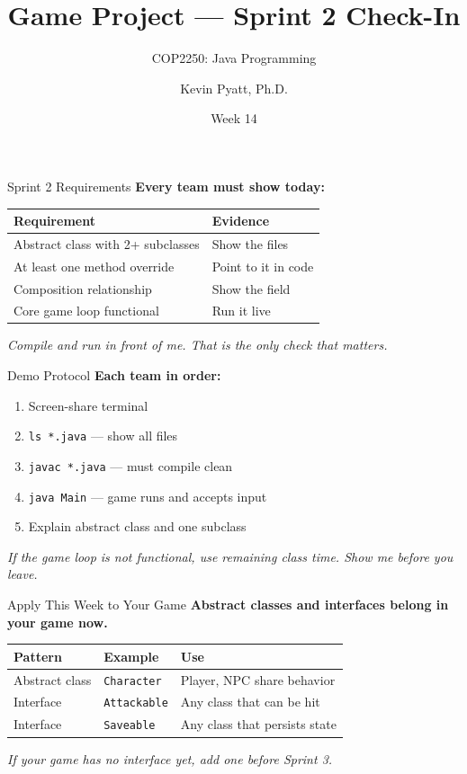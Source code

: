 \documentclass{beamer}
\title[Sprint 2 Check-In]{Game Project --- Sprint 2 Check-In}
\subtitle{COP2250: Java Programming}
\author{Kevin Pyatt, Ph.D.}
\institute{State College of Florida \\ Pyatt Labs}
\date{Week 14}
\begin{document}
\begin{frame}
  \titlepage
\end{frame}
\begin{frame}{Sprint 2 Requirements}
\textbf{Every team must show today:}
\vspace{0.3cm}
\begin{tabular}{ll}
\toprule
\textbf{Requirement} & \textbf{Evidence} \\
\midrule
Abstract class with 2+ subclasses & Show the files \\
At least one method override & Point to it in code \\
Composition relationship & Show the field \\
Core game loop functional & Run it live \\
\bottomrule
\end{tabular}
\vspace{0.3cm}
\textit{Compile and run in front of me. That is the only check that matters.}
\end{frame}
\begin{frame}{Demo Protocol}
\textbf{Each team in order:}
\vspace{0.2cm}
\begin{enumerate}
  \item Screen-share terminal
  \item \texttt{ls *.java} --- show all files
  \item \texttt{javac *.java} --- must compile clean
  \item \texttt{java Main} --- game runs and accepts input
  \item Explain abstract class and one subclass
\end{enumerate}
\vspace{0.3cm}
\textit{If the game loop is not functional, use remaining class time. Show me before you leave.}
\end{frame}
\begin{frame}{Apply This Week to Your Game}
\textbf{Abstract classes and interfaces belong in your game now.}
\vspace{0.3cm}
\begin{tabular}{lll}
\toprule
\textbf{Pattern} & \textbf{Example} & \textbf{Use} \\
\midrule
Abstract class & \texttt{Character} & Player, NPC share behavior \\
Interface & \texttt{Attackable} & Any class that can be hit \\
Interface & \texttt{Saveable} & Any class that persists state \\
\bottomrule
\end{tabular}
\vspace{0.3cm}
\textit{If your game has no interface yet, add one before Sprint 3.}
\end{frame}
\end{document}

